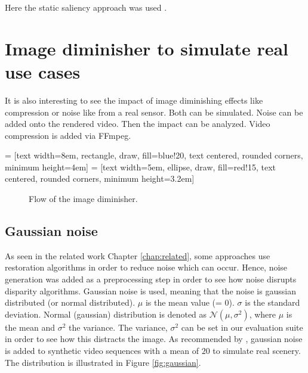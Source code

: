 \noindent Here the static saliency approach was used \citep{hou2007saliency}.


\section{Image diminisher to simulate real use cases}

It is also interesting to see the impact of image diminishing effects like compression or noise like from a real sensor.
Both can be simulated.
Noise can be added onto the rendered video.
Then the impact can be analyzed.
Video compression is added via FFmpeg.

 = [text width=8em, rectangle, draw, fill=blue!20, text centered, rounded corners, minimum height=4em]
 = [text width=5em, ellipse, draw, fill=red!15, text centered, rounded corners, minimum height=3.2em]
\begin{figure}[h!]
  \centering
  \caption{Flow of the image diminisher.}
  \label{fig:image-diminisher-flow}
\end{figure}

\subsection*{Gaussian noise}

As seen in the related work Chapter \ref{chap:related}, some approaches use restoration algorithms in order to reduce noise which can occur.
Hence, noise generation was added as a preprocessing step in order to see how noise disrupts disparity algorithms.
Gaussian noise is used, meaning that the noise is gaussian distributed (or normal distributed).
$\mu$ is the mean value (= 0).
$\sigma$ is the standard deviation.
Normal (gaussian) distribution is denoted as $\mathcal{N}(\mu,\sigma^2)$, where $\mu$ is the mean and $\sigma^2$ the variance.
\newline\newline\noindent The variance, $\sigma^2$ can be set in our evaluation suite in order to see how this distracts the image.
As recommended by \citep{richardt2010real}, gaussian noise is added to synthetic video sequences with a mean of $20$ to simulate real scenery.
The distribution is illustrated in Figure \ref{fig:gaussian}.

